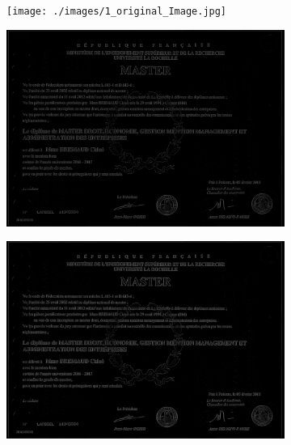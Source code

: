\documentclass[runningheads]{llncs}
\begin{document}
\begin{figure}[h]
	\centering
	\begin{subfigure}[b]{0.4\textwidth}
		\centering\texttt{[image: ./images/1\_original\_Image.jpg]}
		\caption{}
		\label{image_text_0}
	\end{subfigure}%
	\begin{subfigure}[b]{0.28\textwidth}
		\centering	\includegraphics[trim = 97cm 55cm 97cm 73cm, clip,scale=0.062]{./images/2_gradient_Image.jpg}
		\caption{}
		\label{image_text_2}
	\end{subfigure}	
	\begin{subfigure}[b]{0.28\textwidth}
		\centering \includegraphics[trim = 97cm 55cm 97cm 73cm, clip,scale=0.062]{./images/3_filtered_Image.jpg}

\end{subfigure}
\end{figure}
\end{document}
